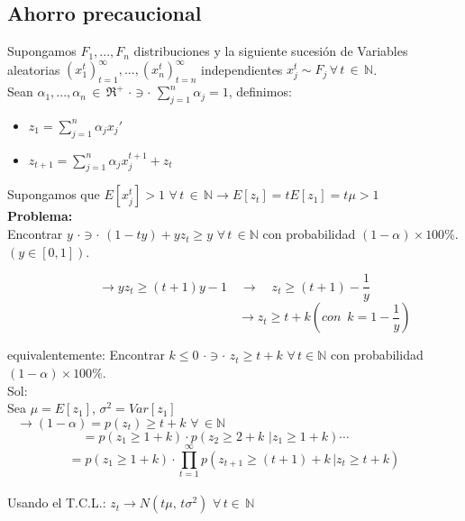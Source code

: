 \subsection{Ahorro precaucional}

Supongamos $F_1,...,F_n$ distribuciones y la siguiente sucesión de Variables aleatorias $(x_1^t)_{t=1}^{\infty},..., (x_n^t)_{t=n}^{\infty}$ independientes $x_j^{t} \sim F_j \,\forall\, t\, \in\, \mathbb{N}$.\\

Sean $\alpha_1,..., \alpha_n\,\in\,\Re^+\,\, \cdot \ni \cdot \,\,\displaystyle \sum_{j=1}^n\alpha_j=1$, definimos:

\begin{itemize}
 \item $z_1=\displaystyle \sum_{j=1}^n\alpha_jx_j'$ 
 \item $z_{t+1}=\displaystyle \sum_{j=1}^n\alpha_jx_j^{t+1}+z_t$ 
\end{itemize}
Supongamos que $E[x_j^t]>1\,\,\forall\,t \,\in\,\mathbb{N}\rightarrow E[z_t]=tE[z_1]=t\mu>1$\\

{\bf Problema:}\\
Encontrar $y \,\,\cdot \ni\cdot\,\,(1-ty)+yz_t \ge y\,\,\forall\,t\,\in \mathbb{N}$ con probabilidad $(1-\alpha)\times 100\%$. $(y\in[0,1])$.

$$\rightarrow y z_t\ge (t+1)y-1\quad\rightarrow\quad z_t\ge(t+1)-\frac{1}{y}$$
$$\qquad\qquad\qquad\qquad\qquad\qquad\qquad\,\,\rightarrow z_t\ge t+k (con\,\,\,k=1-\frac{1}{y})$$

equivalentemente: Encontrar $k\le 0\,\,\cdot\ni\cdot\,\,z_t\ge t+k\,\,\forall\,t\in\mathbb{N}$ con probabilidad $(1-\alpha)\times 100\%$.\\

Sol: \\
Sea $\mu=E[z_1]$, $\sigma^2=Var[z_1]$\\

\[\rightarrow (1-\alpha)=p(z_t)\ge t+k\,\,\forall\,\in\mathbb{N}\qquad\qquad\qquad\qquad\qquad\qquad\qquad\qquad\quad\quad\]
\[=p(z_1\ge 1+k)\cdot p(z_2\ge 2+k\,\,|z_1\ge 1+k)\cdots\qquad\quad\]
\[=p(z_1\ge 1+k)\cdot\displaystyle\prod_{t=1}^{\infty}p(z_{t+1}\ge (t+1)+k\,|z_t\ge t+k)\]\\

Usando el T.C.L.: $z_t \rightarrow N(t\mu,\,t\sigma^2)\,\,\forall\,t\in\,\mathbb{N}$

